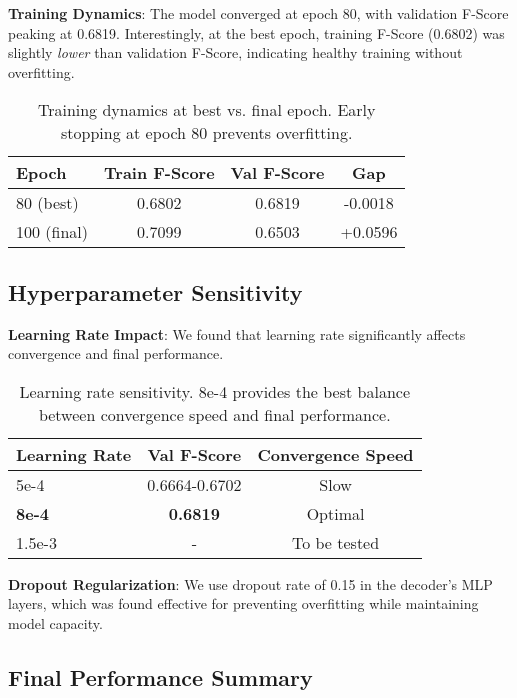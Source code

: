\textbf{Training Dynamics}: The model converged at epoch 80, with validation F-Score peaking at 0.6819. Interestingly, at the best epoch, training F-Score (0.6802) was slightly \textit{lower} than validation F-Score, indicating healthy training without overfitting.

\begin{table}[h]
\centering
\small
\begin{tabular}{lccc}
\hline
Epoch & Train F-Score & Val F-Score & Gap \\
\hline
80 (best) & 0.6802 & 0.6819 & -0.0018 \\
100 (final) & 0.7099 & 0.6503 & +0.0596 \\
\hline
\end{tabular}
\caption{Training dynamics at best vs. final epoch. Early stopping at epoch 80 prevents overfitting.}
\end{table}

\subsection{Hyperparameter Sensitivity}

\textbf{Learning Rate Impact}: We found that learning rate significantly affects convergence and final performance.

\begin{table}[h]
\centering
\small
\begin{tabular}{lcc}
\hline
Learning Rate & Val F-Score & Convergence Speed \\
\hline
5e-4 & 0.6664-0.6702 & Slow \\
\textbf{8e-4} & \textbf{0.6819} & Optimal \\
1.5e-3 & - & To be tested \\
\hline
\end{tabular}
\caption{Learning rate sensitivity. 8e-4 provides the best balance between convergence speed and final performance.}
\end{table}

\textbf{Dropout Regularization}: We use dropout rate of 0.15 in the decoder's MLP layers, which was found effective for preventing overfitting while maintaining model capacity.

\subsection{Final Performance Summary}

